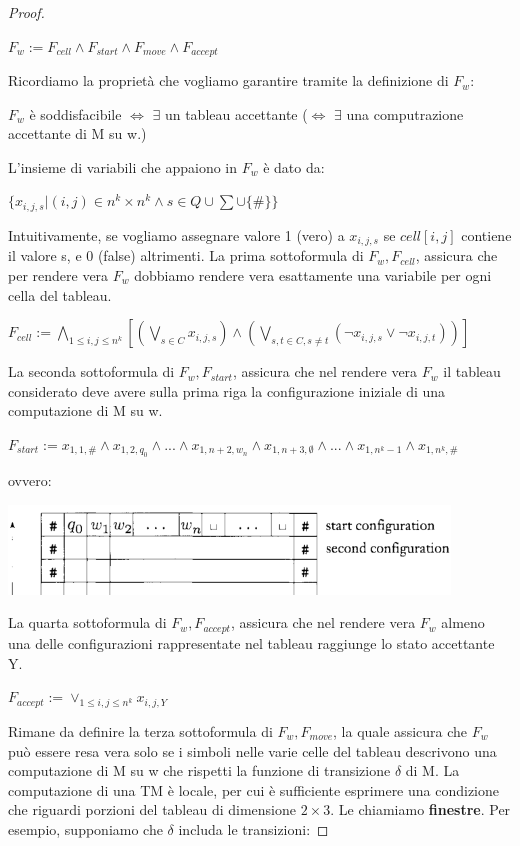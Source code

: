 \documentclass[a4paper, 12pt]{article}
\begin{document}
\begin{proof}
\begin{center}
$F_w := F_{cell} \land F_{start} \land F_{move} \land F_{accept}$
\end{center}
Ricordiamo la propriet\`a che vogliamo garantire tramite la definizione di $F_w$:
\begin{center}
$F_w$ \`e soddisfacibile $\iff$ $\exists$ un tableau accettante ($\iff$ $\exists$ una computrazione accettante di M su w.)
\end{center}
L'insieme di variabili che appaiono in $F_w$ \`e dato da:
\begin{center}
$\{x_{i,j,s} | (i,j) \in n^k \times n^k \land s \in Q \cup \sum \cup \{\#\}\}$
\end{center}
Intuitivamente, se vogliamo assegnare valore 1 (vero) a $x_{i,j,s}$ se $cell[i,j]$ contiene il valore s, e 0 (false) altrimenti.
La prima sottoformula di $F_w, F_{cell}$, assicura che per rendere vera $F_w$ dobbiamo rendere vera esattamente una variabile per ogni cella del tableau.
\begin{center}
$F_{cell} := \bigwedge_{1\leq i, j\leq n^{k}} [(\bigvee_{s \in C}x_{i,j,s}) \land (\bigvee_{s,t \in C, s \neq t} (\neg x_{i,j,s} \lor \neg x_{i,j,t}))]$
\end{center}
La seconda sottoformula di $F_w, F_{start}$, assicura che nel rendere vera $F_w$ il tableau considerato deve avere sulla prima riga la configurazione iniziale di una computazione di M su w.
\begin{center}
$F_{start} := x_{1,1,\#} \land x_{1,2,q_0} \land ... \land x_{1,n+2,w_n} \land x_{1,n+3, \emptyset} \land ... \land x_{1,n^{k}-1} \land x_{1,n^{k},\#}$
\end{center}
ovvero:
\begin{center}
\includegraphics[scale=0.5]{tableau2.png}
\end{center}
La quarta sottoformula di $F_w, F_{accept}$, assicura che nel rendere vera $F_w$ almeno una delle configurazioni rappresentate nel tableau raggiunge lo stato accettante Y.
\begin{center}
$F_{accept} := \lor_{1\leq i,j\leq n^{k}} x_{i,j,Y}$
\end{center}
Rimane da definire la terza sottoformula di $F_w, F_{move}$, la quale assicura che $F_w$ pu\`o essere resa vera solo se i simboli nelle varie celle del tableau descrivono una computazione di M su w che rispetti la funzione di transizione $\delta$ di M. La computazione di una TM \`e locale, per cui \`e sufficiente esprimere una condizione che riguardi porzioni del tableau di dimensione $2 \times 3$. Le chiamiamo \textbf{finestre}. Per esempio, supponiamo che $\delta$ includa le transizioni:

\end{proof}
\end{document}
